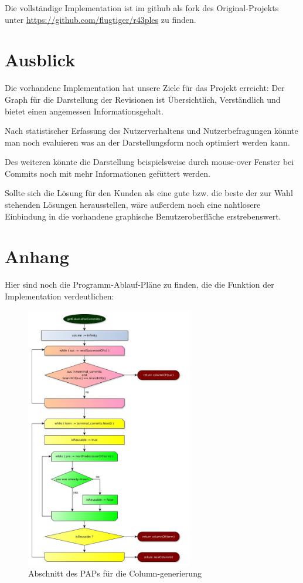 \documentclass[color, ddc]{tudscrreprt}
\begin{document}
Die vollständige Implementation ist im github als fork des Original-Projekts unter \url{https://github.com/flugtiger/r43ples} zu finden.


\section{Ausblick}

Die vorhandene Implementation hat unsere Ziele für das Projekt erreicht: Der Graph für die Darstellung der Revisionen ist  Übersichtlich, Verständlich und bietet einen angemessen Informationsgehalt.

Nach statistischer Erfassung des Nutzerverhaltens und Nutzerbefragungen könnte man noch evaluieren was an der Darstellungsform noch optimiert werden kann. 

Des weiteren könnte die Darstellung beispielsweise durch mouse-over Fenster bei Commits noch mit mehr Informationen gefüttert werden. 

Sollte sich die Lösung für den Kunden als eine gute bzw. die beste der zur Wahl stehenden Lösungen herausstellen, wäre außerdem noch eine nahtlosere Einbindung in die vorhandene graphische Benutzeroberfläche erstrebenswert.

\section*{Anhang}
Hier sind noch die Programm-Ablauf-Pläne zu finden, die die Funktion der Implementation verdeutlichen:
\begin{figure}[ht!]
\centering
\includegraphics[width=0.65\textwidth]{Skizzen/PAP_getColumnForCommit.jpg}
\caption{Abschnitt des PAPs für die Column-generierung}
\label{pap-column-img}
\end{figure}
\end{document}
